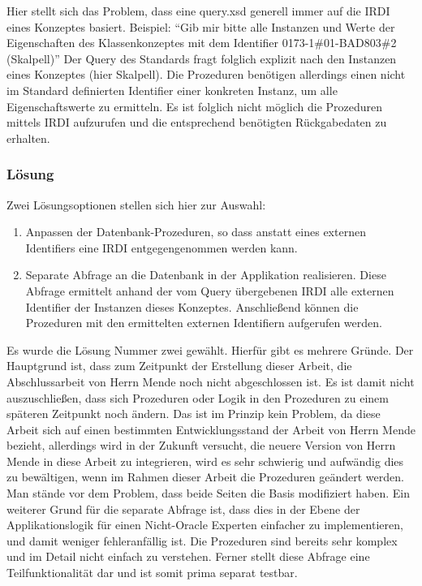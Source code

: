 Hier stellt sich das Problem, dass eine query.xsd generell immer auf die IRDI eines Konzeptes basiert. 
Beispiel: \enquote{Gib mir bitte alle Instanzen und Werte der Eigenschaften des Klassenkonzeptes mit dem Identifier 0173-1\#01-BAD803\#2 (Skalpell)}
Der Query des Standards fragt folglich explizit nach den Instanzen eines Konzeptes (hier Skalpell). Die Prozeduren benötigen allerdings einen nicht im Standard definierten Identifier einer konkreten Instanz, um alle Eigenschaftswerte zu ermitteln. Es ist folglich nicht möglich die Prozeduren mittels IRDI aufzurufen und die entsprechend benötigten Rückgabedaten zu erhalten. 

\subsubsection{Lösung}

Zwei Lösungsoptionen stellen sich hier zur Auswahl:
\begin{enumerate}
\item Anpassen der Datenbank-Prozeduren, so dass anstatt eines externen Identifiers eine IRDI entgegengenommen werden kann.
\item Separate Abfrage an die Datenbank in der Applikation realisieren. Diese Abfrage ermittelt anhand der vom Query übergebenen IRDI alle externen Identifier der Instanzen dieses Konzeptes. Anschließend können die Prozeduren mit den ermittelten externen Identifiern aufgerufen werden.   
\end{enumerate}

Es wurde die Lösung Nummer zwei gewählt. Hierfür gibt es mehrere Gründe. Der Hauptgrund ist, dass zum Zeitpunkt der Erstellung dieser Arbeit, die Abschlussarbeit von Herrn Mende noch nicht abgeschlossen ist. Es ist damit nicht auszuschließen, dass sich Prozeduren oder Logik in den Prozeduren zu einem späteren Zeitpunkt noch ändern. Das ist im Prinzip kein Problem, da diese Arbeit sich auf einen bestimmten Entwicklungsstand der Arbeit von Herrn Mende bezieht, allerdings wird in der Zukunft versucht, die neuere Version von Herrn Mende in diese Arbeit zu integrieren, wird es sehr schwierig und aufwändig dies zu bewältigen, wenn im Rahmen dieser Arbeit die Prozeduren geändert werden. Man stände vor dem Problem, dass beide Seiten die Basis modifiziert haben. 
Ein weiterer Grund für die separate Abfrage ist, dass dies in der Ebene der Applikationslogik für einen Nicht-Oracle Experten einfacher zu implementieren, und damit weniger fehleranfällig ist. Die Prozeduren sind bereits sehr komplex und im Detail nicht einfach zu verstehen. 
Ferner stellt diese Abfrage eine Teilfunktionalität dar und ist somit prima separat testbar.  

